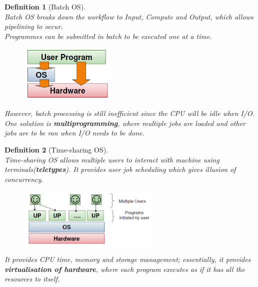 \documentclass[12pt]{article}
\newtheorem{definition}{Definition}[section]
\theoremstyle{definition}
\begin{document}
\begin{definition}[Batch OS]
\hfill\\\normalfont Batch OS breaks down the workflow to Input, Compute and Output, which allows pipelining to occur.\\
Programmes can be \textit{submitted in batch} to be \textit{executed one at a time}. \\
\begin{figure}[h]
\centering
\includegraphics[width = 0.4\textwidth]{1_2.png}
\end{figure}
However, batch processing is still inefficient since the CPU will be idle when I/O. One solution is \textbf{multiprogramming}, where multiple jobs are loaded and other jobs are to be ran when I/O needs to be done.
\end{definition}
\begin{definition}[Time-sharing OS]
\hfill\\\normalfont Time-sharing OS allows multiple users to interact with machine using terminals(\textbf{teletypes}). It provides user job scheduling which gives \textit{illusion} of concurrency. \\
\begin{figure}[h]
\centering
\includegraphics[width = 0.6\textwidth]{1_3.png}
\end{figure}
It provides CPU time, memory and storage management; essentially, it provides \textbf{virtualisation of hardware}, where each program executes as if it has all the resources to itself.
\end{definition}
\end{document}
